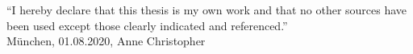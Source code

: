 \documentclass[12pt,a4paper,twoside]{report}
\begin{document}
\vspace*{150mm}
“I hereby declare that this thesis is my own work and that no other sources have been used except those clearly indicated and referenced.”
\\[15mm]
M\"unchen, 01.08.2020, Anne Christopher

\bigskip
\newpage

\newpage

\newpage
\tableofcontents
\newpage
\pagestyle{headings}





\renewcommand\bibname{References}


\end{document}
